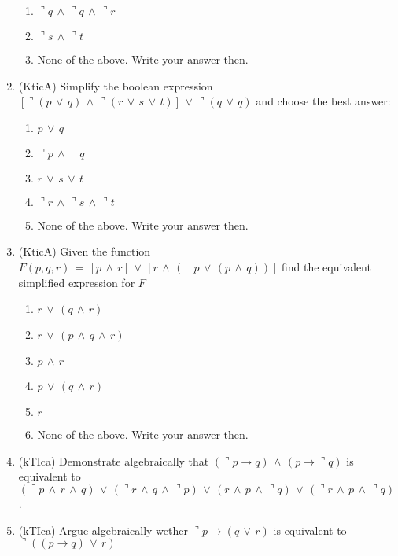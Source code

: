 \documentclass{article}
\begin{document}
\begin{enumerate}
\begin{enumerate}
\item $\urcorner q\,\wedge\,\urcorner q\,\wedge\,\urcorner r$
\item $\urcorner s\,\wedge\, \urcorner t$
\item None of the above. Write your answer then.
\end{enumerate}
\item (KticA) Simplify the boolean expression $\left[\urcorner (p\,\vee\,q)\,\wedge\,\urcorner (r\,\vee\,s\,\vee\,t)\right]\,\vee\,\urcorner (q\,\vee\,q)$
and choose the best answer:
\begin{enumerate}
\item $p\,\vee\,q$
\item $\urcorner p\,\wedge\,\urcorner q$
\item $r\,\vee\,s\,\vee\,t$
\item $\urcorner r\,\wedge\,\urcorner s\,\wedge\, \urcorner t$
\item None of the above. Write your answer then.
\end{enumerate}
\item (KticA) Given the function $F(p,q,r)\,=\,\left[ p\,\wedge\,r\right]\,\vee\,\left[r\,\wedge\,(\urcorner p\,\vee\,(p\,\wedge\,q))\right]$ find the equivalent simplified 
expression for $F$
\begin{enumerate}
\item $r\,\vee\,(q\,\wedge\,r)$
\item $r\,\vee\,(p\,\wedge\,q\,\wedge\,r)$
\item $p\,\wedge\,r$
\item $p\,\vee\,(q\,\wedge\,r)$
\item $r$
\item None of the above. Write your answer then.
\end{enumerate}
\item (kTIca) Demonstrate algebraically that $(\urcorner p\rightarrow q)\,\wedge\,(p \rightarrow \urcorner q)$ is equivalent to 
$(\urcorner p\,\wedge\, r\,\wedge\, q)\,\vee\,(\urcorner r\,\wedge\, q\,\wedge\,\urcorner p)\,\vee\,(r\,\wedge\, p\,\wedge\, \urcorner q)\,\vee\,(\urcorner r\,\wedge\, p\,\wedge\,\urcorner q)$.
\item (kTIca) Argue algebraically wether $\urcorner p \rightarrow (q\,\vee\,r)$ is equivalent to $\urcorner ((p\rightarrow q)\,\vee\,r)$
\end{enumerate}
\end{document}
